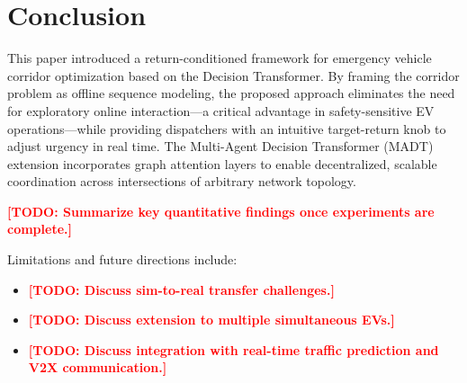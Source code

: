 \documentclass[journal]{IEEEtran}
\newcommand{\todo}[1]{\textcolor{red}{\textbf{[TODO: #1]}}}
\begin{document}
\section{Conclusion}
\label{sec:conclusion}

This paper introduced a return-conditioned framework for emergency
vehicle corridor optimization based on the Decision Transformer.
By framing the corridor problem as offline sequence modeling, the
proposed approach eliminates the need for exploratory online
interaction---a critical advantage in safety-sensitive EV
operations---while providing dispatchers with an intuitive
target-return knob to adjust urgency in real time.  The Multi-Agent
Decision Transformer (MADT) extension incorporates graph attention
layers to enable decentralized, scalable coordination across
intersections of arbitrary network topology.

\todo{Summarize key quantitative findings once experiments are
complete.}

Limitations and future directions include:
\begin{itemize}
  \item \todo{Discuss sim-to-real transfer challenges.}
  \item \todo{Discuss extension to multiple simultaneous EVs.}
  \item \todo{Discuss integration with real-time traffic prediction
    and V2X communication.}
\end{itemize}



\end{document}
